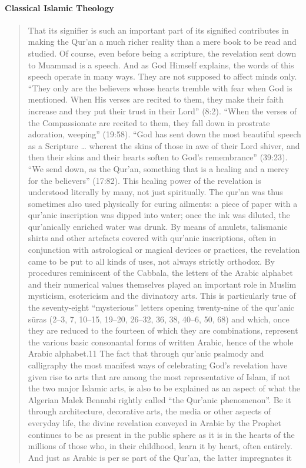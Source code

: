 \paragraph{Classical Islamic Theology} \cite{winter_cambridge_2008}
\begin{quote} 
    That its signifier is such an important part of its signified contributes in making the Qur’an a much richer reality than a mere book to be read and studied. Of course, even before being a scripture, the revelation sent down to Muammad is a speech. And as God Himself explains, the words of this speech operate in many ways. They are not supposed to affect minds only. “They only are the believers whose hearts tremble with fear when God is mentioned. When His verses are recited to them, they make their faith increase and they put their trust in their Lord” (8:2). “When the verses of the Compassionate are recited to them, they fall down in prostrate adoration, weeping” (19:58). “God has sent down the most beautiful speech as a Scripture … whereat the skins of those in awe of their Lord shiver, and then their skins and their hearts soften to God’s remembrance” (39:23). “We send down, as the Qur’an, something that is a healing and a mercy for the believers” (17:82). This healing power of the revelation is understood literally by many, not just spiritually. The qur’an was thus sometimes also used physically for curing ailments: a piece of paper with a qur’anic inscription was dipped into water; once the ink was diluted, the qur’anically enriched water was drunk. By means of amulets, talismanic shirts and other artefacts covered with qur’anic inscriptions, often in conjunction with astrological or magical devices or practices, the revelation came to be put to all kinds of uses, not always strictly orthodox. By procedures reminiscent of the Cabbala, the letters of the Arabic alphabet and their numerical values themselves played an important role in Muslim mysticism, esotericism and the divinatory arts. This is particularly true of the seventy-eight “mysterious” letters opening twenty-nine of the qur’anic sūras (2–3, 7, 10–15, 19–20, 26–32, 36, 38, 40–6, 50, 68) and which, once they are reduced to the fourteen of which they are combinations, represent the various basic consonantal forms of written Arabic, hence of the whole Arabic alphabet.11 The fact that through qur’anic psalmody and calligraphy the most manifest ways of celebrating God’s revelation have given rise to arts that are among the most representative of Islam, if not the two major Islamic arts, is also to be explained as an aspect of what the Algerian Malek Bennabi rightly called “the Qur’anic phenomenon”. Be it through architecture, decorative arts, the media or other aspects of everyday life, the divine revelation conveyed in Arabic by the Prophet continues to be as present in the public sphere as it is in the hearts of the millions of those who, in their childhood, learn it by heart, often entirely. And just as Arabic is per se part of the Qur’an, the latter impregnates it 
\end{quote}
